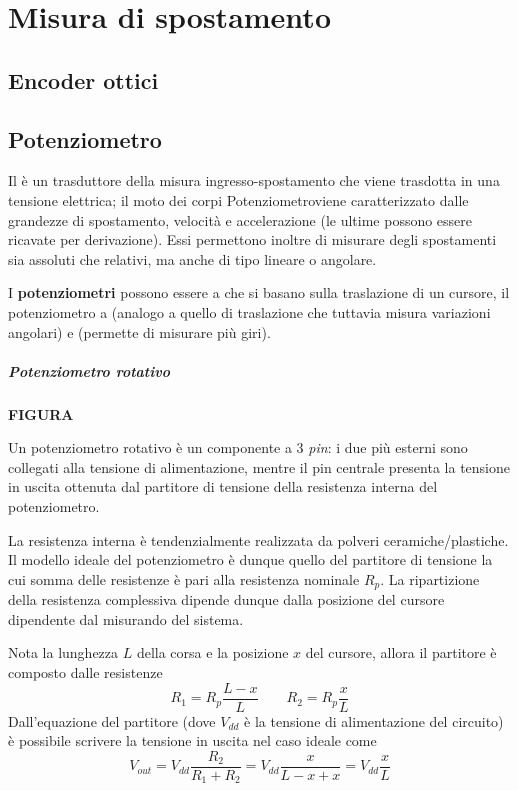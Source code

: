 \chapter{Misura di spostamento}

\section{Encoder ottici}

\section{Potenziometro}
	Il  è un trasduttore della misura ingresso-spostamento che viene trasdotta in una tensione elettrica; il moto dei corpi Potenziometroviene caratterizzato dalle grandezze di spostamento, velocità e accelerazione (le ultime possono essere ricavate per derivazione). Essi permettono inoltre di misurare degli spostamenti sia assoluti che relativi, ma anche di tipo lineare o angolare.
	
	I \textbf{potenziometri} possono essere a  che si basano sulla traslazione di un cursore, il potenziometro a  (analogo a quello di traslazione che tuttavia misura variazioni angolari) e  (permette di misurare più giri).
	
	\paragraph{Potenziometro rotativo} \textbf{FIGURA}
	
	Un potenziometro rotativo è un componente a 3 \textit{pin}: i due più esterni sono collegati alla tensione di alimentazione, mentre il pin centrale presenta la tensione in uscita ottenuta dal partitore di tensione della resistenza interna del potenziometro.
	
	La resistenza interna è tendenzialmente realizzata da polveri ceramiche/plastiche. Il modello ideale del potenziometro è dunque quello del partitore di tensione la cui somma delle resistenze è pari alla resistenza nominale $R_p$. La ripartizione della resistenza complessiva dipende dunque dalla posizione del cursore dipendente dal misurando del sistema.
	
	Nota la lunghezza $L$ della corsa e la posizione $x$ del cursore, allora il partitore è composto dalle resistenze
	\[ R_1 = R_p \frac{L-x}{L} \qquad R_2 = R_p \frac x L\]
	Dall'equazione del partitore (dove $V_{dd}$ è la tensione di alimentazione del circuito) è possibile scrivere la tensione in uscita nel caso ideale come 
	\begin{equation} \label{eq:pot:ideale}
		V_{out}= V_{dd} \frac{R_2}{R_1+R_2} = V_{dd} \frac{x}{L-x+x} = V_{dd} \frac x L
	\end{equation}
	
